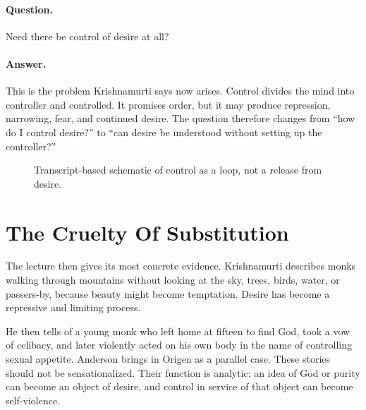 \documentclass[11pt,oneside]{book}
\begin{document}
\paragraph{Question.}
Need there be control of desire at all?

\paragraph{Answer.}
This is the problem Krishnamurti says now arises. Control divides the mind into controller and controlled. It promises order, but it may produce repression, narrowing, fear, and continued desire. The question therefore changes from ``how do I control desire?'' to ``can desire be understood without setting up the controller?''

\begin{figure}
\centering
{}

Transcript-based schematic of control as a loop, not a release from desire.
\end{figure}

\section{The Cruelty Of Substitution}

The lecture then gives its most concrete evidence. Krishnamurti describes monks walking through mountains without looking at the sky, trees, birds, water, or passers-by, because beauty might become temptation. Desire has become a repressive and limiting process.

He then tells of a young monk who left home at fifteen to find God, took a vow of celibacy, and later violently acted on his own body in the name of controlling sexual appetite. Anderson brings in Origen as a parallel case. These stories should not be sensationalized. Their function is analytic: an idea of God or purity can become an object of desire, and control in service of that object can become self-violence.
\end{document}

